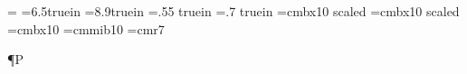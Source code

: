 


\expandafter\def\expandafter\+\expandafter{\+}


\usetikzlibrary{calc,intersections}

\magnification= 
\hsize=6.5truein
\vsize=8.9truein
\hoffset=.55 truein
\voffset=.7 truein
\loadeurm
\loadbold
\NoBlackBoxes
\font\twbf=cmbx10 scaled
\font\chbf=cmbx10 scaled
\font\hdbf=cmbx10
\font\mb=cmmib10                      %
\font\smrm=cmr7  


\gka{\alpha}
\gkb{\beta}
\gkc{\gamma}
\gkd{\delta}
\gke{\epsilon}
\gkf{\varphi} %
\gkh{\eta}
\gki{\iota}
\gkk{\kappa}
\gkl{\lambda}
\gkm{\mu}
\gkn{\nu}
\gkp{\pi}
\gkr{\rho}
\gks{\sigma}
\gkt{\tau}
\gkth{\theta}
\gkw{\omega}
\gkz{\zeta}

\redefine\P{{\Bbb P}} %

\redefine{} %
\redefine{} %

